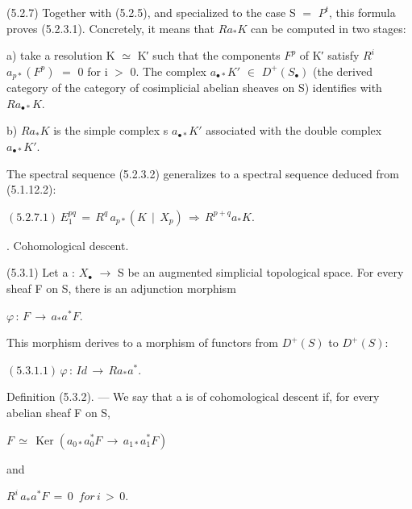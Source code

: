 \documentclass[11pt,twoside]{article}
\newcommand{\DFormula}[1]{%
  \par\smallskip\noindent\hspace*{0pt}\(\displaystyle #1\)\par\smallskip
}
\begin{document}
(5.2.7) Together with (5.2.5), and specialized to the case S \(=\) \(P^{t}\), this formula proves (5.2.3.1). Concretely, it means that \(Ra_{\ast }K\) can be computed in two stages:\par
\par\medskip
a) take a resolution K \(\simeq \) K′ such that the components \(F^{p}\) of K′ satisfy \(R^{i}\) \(a_{p\ast }(F^{p})\) \(=\) 0 for i \(>\) 0. The complex \(a_{\bullet \ast }K′\) \(\in \) \(D^{+}(S_{\bullet })\) (the derived category of the category of cosimplicial abelian sheaves on S) identifies with \(Ra_{\bullet \ast }K\).\par
\par\medskip
b) \(Ra_{\ast }K\) is the simple complex s \(a_{\bullet \ast }K′\) associated with the double complex \(a_{\bullet \ast }K′\).\par
\par\medskip
The spectral sequence (5.2.3.2) generalizes to a spectral sequence deduced from (5.1.12.2):\par
\par\medskip
\DFormula{(5.2.7.1)\,E_{1}^{pq}\,=\,R^{q}\,a_{p\ast }(K\,\mid \,X_{p})\,\Rightarrow \,R^{p+q}a_{\ast }K.}
\par{}. Cohomological descent.\par
\par\medskip
(5.3.1) Let a : \(X_{\bullet }\) \(\to \) S be an augmented simplicial topological space. For every sheaf F on S, there is an adjunction morphism\par
\par\medskip
\DFormula{\varphi \,:\,F\,\to \,a_{\ast }a^{\ast }F.}
\par\medskip
This morphism derives to a morphism of functors from \(D^{+}(S)\) to \(D^{+}(S)\):\par
\par\medskip
\DFormula{(5.3.1.1)\,\varphi \,:\,Id\,\to \,Ra_{\ast }a^{\ast }.}
\par\medskip
Definition (5.3.2). — We say that a is of cohomological descent if, for every abelian sheaf F on S,\par
\par\medskip
\DFormula{F\,\simeq \,\operatorname{Ker}(a_{0\ast }a_{0}^{\ast }F\,\to \,a_{1\ast }a_{1}^{\ast }F)}
\par\medskip
and\par
\par\medskip
\DFormula{R^{i}\,a_{\ast }a^{\ast }F\,=\,0\,\,\,for\,i\,>\,0.}
\par\medskip
\end{document}
